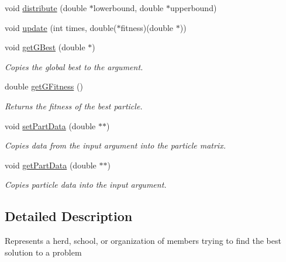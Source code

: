 \begin{DoxyCompactItemize}
void \mbox{\hyperlink{class_swarm_a9da23c6a5013d4d24b1591e6a44c803e}{distribute}} (double $\ast$lowerbound, double $\ast$upperbound)
\item 
void \mbox{\hyperlink{class_swarm_ae2156e78f44bfd081fa6cf870dfdba81}{update}} (int times, double($\ast$fitness)(double $\ast$))
\item 
\mbox{\label{class_swarm_ad569b11fd6425effd1129c52fded1ed2}} 
void \mbox{\hyperlink{class_swarm_ad569b11fd6425effd1129c52fded1ed2}{get\+G\+Best}} (double $\ast$)
\begin{DoxyCompactList}\small\item\em Copies the global best to the argument. \end{DoxyCompactList}\item 
\mbox{\label{class_swarm_a82e774fd8a91796534edf3a94adf3731}} 
double \mbox{\hyperlink{class_swarm_a82e774fd8a91796534edf3a94adf3731}{get\+G\+Fitness}} ()
\begin{DoxyCompactList}\small\item\em Returns the fitness of the best particle. \end{DoxyCompactList}\item 
\mbox{\label{class_swarm_a1ab190eac2e0740bc16a51933c53c540}} 
void \mbox{\hyperlink{class_swarm_a1ab190eac2e0740bc16a51933c53c540}{set\+Part\+Data}} (double $\ast$$\ast$)
\begin{DoxyCompactList}\small\item\em Copies data from the input argument into the particle matrix. \end{DoxyCompactList}\item 
\mbox{\label{class_swarm_ac127974af7fdf64c8e2879e531d36c4b}} 
void \mbox{\hyperlink{class_swarm_ac127974af7fdf64c8e2879e531d36c4b}{get\+Part\+Data}} (double $\ast$$\ast$)
\begin{DoxyCompactList}\small\item\em Copies particle data into the input argument. \end{DoxyCompactList}\end{DoxyCompactItemize}


\subsection{Detailed Description}
Represents a herd, school, or organization of members trying to find the best solution to a problem 

